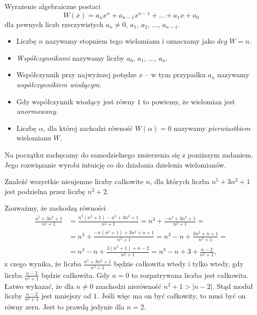 


\noindent
Wyrażenie algebraiczne postaci
\[
    W(x) = a_nx^n + a_{n - 1}x^{n - 1} + ... + a_1x + a_0
\]
dla pewnych liczb rzeczywistych $a_n \neq 0$, $a_1$, $a_2$, ..., $a_{n - 1}$.
\begin{itemize}
    \item Liczbę $n$ nazywamy stopniem tego wielomianu i oznaczamy jako $deg \; W = n$.

    \item \textit{Współczynnikami} nazywamy liczby $a_0$, $a_1$, ..., $a_n$.

    \item Współczynnik przy najwyższej potędze $x$ -- w tym przypadku $a_n$ nazywamy \textit{współczynnikiem wiodącym}.

    \item Gdy współczynnik wiodący jest równy $1$ to powiemy, że wielomian jest \textit{unormowany}.

    \item Liczbę $\alpha$, dla której zachodzi równość $W(\alpha) = 0$ nazywamy \textit{pierwiastkiem} wielomianu $W$.
\end{itemize}

\vspace{5px}

\noindent 
Na początku zachęcamy do samodzielnego zmierzenia się z poniższym zadaniem. Jego rozwiązanie wyrobi intuicję co do działania dzielenia wielomianów.

\vspace{5px}


\noindent
Znaleźć wszystkie nieujemne liczby całkowite $n$, dla których liczba $n^5 + 3n^2 + 1$ jest podzielna przez liczbę $n^2 + 2$.

\vspace{5px}


\noindent
Zauważmy, że zachodzą równości
\begin{align*}
    \frac{n^5 + 3n^2 + 1}{n^2 + 1} &= 
    \frac{n^3(n^2 + 1) - n^3 + 3n^2 + 1}{n^2 + 1} 
    = n^3 + \frac{- n^3 + 3n^2 + 1}{n^2 + 1} = \\
    &= n^3 + \frac{-n(n^2 + 1) + 3n^2 + n + 1}{n^2 + 1} 
    = n^3 - n + \frac{3n^2 + n + 1}{n^2 + 1} = \\
    &= n^3 - n + \frac{3(n^2 + 1) + n - 2}{n^2 + 1}
    =  n^3 - n + 3 + \frac{n - 2}{n^2 + 1}, 
\end{align*} 
z czego wynika, że liczba $\frac{n^5 + 3n^2 + 1}{n^2 + 1}$ będzie całkowita wtedy i tylko wtedy, gdy liczba $\frac{n - 2}{n^2 + 1}$ będzie całkowita. Gdy $n = 0$ to rozpatrywana liczba jest całkowita. Łatwo wykazać, że dla $n \neq 0$ zaachodzi nierówność $n^2 + 1 > |n - 2|$. Stąd moduł liczby $\frac{n - 2}{n^2 + 1}$ jest mniejszy od $1$. Jeśli więc ma on być całkowity, to musi być on równy zeru. Jest to prawdą jedynie dla $n = 2$.

